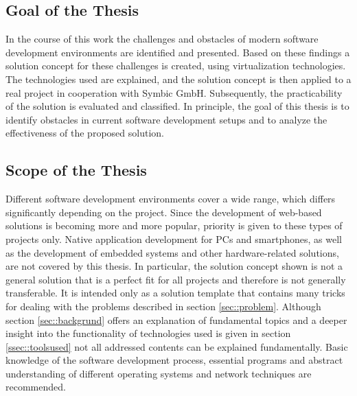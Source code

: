     \subsection{Goal of the Thesis}
    In the course of this work the challenges and obstacles of modern software development environments are identified and presented. Based on these findings a solution concept for these challenges is created, using virtualization technologies. The technologies used are explained, and the solution concept is then applied to a real project in cooperation with Symbic GmbH. Subsequently, the practicability of the solution is evaluated and classified. In principle, the goal of this thesis is to identify obstacles in current software development setups and to analyze the effectiveness of the proposed solution.

    \subsection{Scope of the Thesis}
    Different software development environments cover a wide range, which differs significantly depending on the project. Since the development of web-based solutions is becoming more and more popular, priority is given to these types of projects only. Native application development for PCs and smartphones, as well as the development of embedded systems and other hardware-related solutions, are not covered by this thesis.\newline
    In particular, the solution concept shown is not a general solution that is a perfect fit for all projects and therefore is not generally transferable. It is intended only as a solution template that contains many tricks for dealing with the problems described in section \ref{sec::problem}. Although section \ref{sec::backgrund} offers an explanation of fundamental topics and a deeper insight into the functionality of technologies used is given in section \ref{ssec::toolsused} not all addressed contents can be explained fundamentally. Basic knowledge of the software development process, essential programs and abstract understanding of different operating systems and network techniques are recommended.


